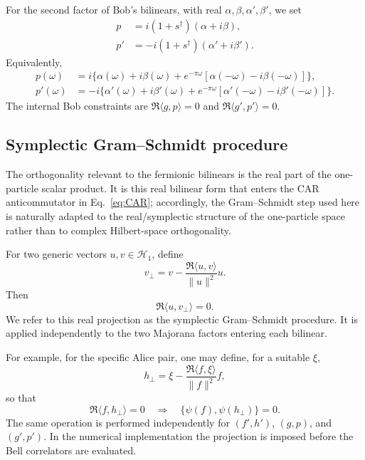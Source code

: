 \documentclass[11pt]{article}
\begin{document}
For the second factor of Bob's bilinears, with real $\alpha,\beta,\alpha',\beta'$, we set
\begin{align}
 p&=i(1+s^\dagger)(\alpha+i\beta),
 \label{eq:pconstruct}\\
 p'&=-i(1+s^\dagger)(\alpha'+i\beta').
 \label{eq:ppconstruct}
\end{align}
Equivalently,
\begin{align}
 p(\omega)
 &=i\Big\{\alpha(\omega)+i\beta(\omega)
 +e^{-\pi\omega}[\alpha(-\omega)-i\beta(-\omega)]\Big\},
 \label{eq:pexplicit}\\
 p'(\omega)
 &=-i\Big\{\alpha'(\omega)+i\beta'(\omega)
 +e^{-\pi\omega}[\alpha'(-\omega)-i\beta'(-\omega)]\Big\}.
 \label{eq:pexplicitprime}
\end{align}
The internal Bob constraints are $\Re\langle g,p\rangle=0$ and $\Re\langle g',p'\rangle=0$.

\subsection{Symplectic Gram--Schmidt procedure}

The orthogonality relevant to the fermionic bilinears is the real part of the one-particle scalar product. It is this real bilinear form that enters the CAR anticommutator in Eq.~\eqref{eq:CAR}; accordingly, the Gram--Schmidt step used here is naturally adapted to the real/symplectic structure of the one-particle space rather than to complex Hilbert-space orthogonality.

For two generic vectors $u,v\in\mathcal H_1$, define
\begin{equation}
 v_{\perp}
 =v-\frac{\Re\langle u,v\rangle}{\|u\|^2}u.
 \label{eq:GSgeneric}
\end{equation}
Then
\begin{equation}
 \Re\langle u,v_{\perp}\rangle=0.
 \label{eq:GSgenericorth}
\end{equation}
We refer to this real projection as the symplectic Gram--Schmidt procedure. It is applied independently to the two Majorana factors entering each bilinear.

For example, for the specific Alice pair, one may define, for a suitable $\xi$,
\begin{equation}
 h_{\perp}
 =\xi-\frac{\Re\langle f,\xi\rangle}{\|f\|^2}f,
 \label{eq:GSfh}
\end{equation}
so that
\begin{equation}
 \Re\langle f,h_{\perp}\rangle=0
 \quad\Longrightarrow\quad
 \{\psi(f),\psi(h_{\perp})\}=0.
 \label{eq:GSfhorth}
\end{equation}
The same operation is performed independently for $(f',h')$, $(g,p)$, and $(g',p')$. In the numerical implementation the projection is imposed before the Bell correlators are evaluated.
\end{document}
